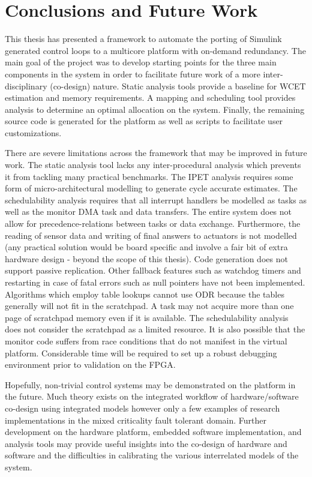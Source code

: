 
\chapter{Conclusions and Future Work} 

\label{c:concl} 

	This thesis has presented a framework to automate the porting of Simulink generated control loops to a multicore platform with on-demand redundancy.
	The main goal of the project was to develop starting points for the three main components in the system in order to facilitate future work of a more inter-disciplinary (co-design) nature. 
	Static analysis tools provide a baseline for WCET estimation and memory requirements. 
	A mapping and scheduling tool provides analysis to determine an optimal allocation on the system.
	Finally, the remaining source code is generated for the platform as well as scripts to facilitate user customizations.
	
	There are severe limitations across the framework that may be improved in future work.
	The static analysis tool lacks any inter-procedural analysis which prevents it from tackling many practical benchmarks.
	The IPET analysis requires some form of micro-architectural modelling to generate cycle accurate estimates.
	The schedulability analysis requires that all interrupt handlers be modelled as tasks as well as the monitor DMA task and data transfers.
	The entire system does not allow for precedence-relations between tasks or data exchange. 
	Furthermore, the reading of sensor data and writing of final answers to actuators is not modelled (any practical solution would be board specific and involve a fair bit of extra hardware design - beyond the scope of this thesis).
	Code generation does not support passive replication.
	Other fallback features such as watchdog timers and restarting in case of fatal errors such as null pointers have not been implemented.
	Algorithms which employ table lookups cannot use ODR because the tables generally will not fit in the scratchpad.
	A task may not acquire more than one page of scratchpad memory even if it is available.
	The schedulability analysis does not consider the scratchpad as a limited resource.
	It is also possible that the monitor code suffers from race conditions that do not manifest in the virtual platform. 
	Considerable time will be required to set up a robust debugging environment prior to validation on the FPGA.
	
	Hopefully, non-trivial control systems may be demonstrated on the platform in the future. 
	Much theory exists on the integrated workflow of hardware/software co-design using integrated models however only a few examples of research implementations in the mixed criticality fault tolerant domain.
	Further development on the hardware platform, embedded software implementation, and analysis tools may provide useful insights into the co-design of hardware and software and the difficulties in calibrating the various interrelated models of the system.
		